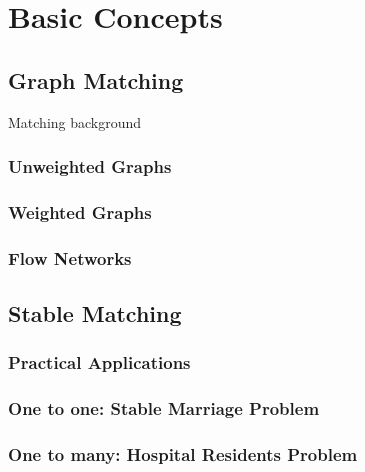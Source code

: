\section{Basic Concepts}
\label{sec:basic_concepts}

\subsection{Graph Matching}
Matching background

\subsubsection{Unweighted Graphs}

\subsubsection{Weighted Graphs}

\subsubsection{Flow Networks}

\subsection{Stable Matching}

\subsubsection{Practical Applications}

\subsubsection{One to one: Stable Marriage Problem}

\subsubsection{One to many: Hospital Residents Problem}
